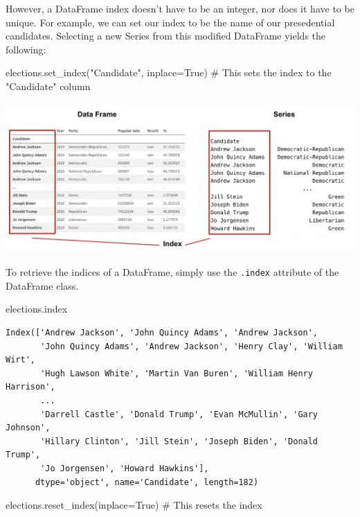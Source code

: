 \documentclass[
  letterpaper,
  DIV=11,
  numbers=noendperiod]{scrreprt}
\newenvironment{Shaded}{\begin{snugshade}}{\end{snugshade}}
\newcommand{\CommentTok}[1]{\textcolor[rgb]{0.37,0.37,0.37}{#1}}
\newcommand{\NormalTok}[1]{\textcolor[rgb]{0.00,0.23,0.31}{#1}}
\newcommand{\OperatorTok}[1]{\textcolor[rgb]{0.37,0.37,0.37}{#1}}
\newcommand{\StringTok}[1]{\textcolor[rgb]{0.13,0.47,0.30}{#1}}
\newcommand{\VariableTok}[1]{\textcolor[rgb]{0.07,0.07,0.07}{#1}}
\begin{document}
However, a DataFrame index doesn't have to be an integer, nor does it
have to be unique. For example, we can set our index to be the name of
our presedential candidates. Selecting a new Series from this modified
DataFrame yields the following:

\begin{Shaded}
\begin{Highlighting}[]
\NormalTok{elections.set\_index(}\StringTok{"Candidate"}\NormalTok{, inplace}\OperatorTok{=}\VariableTok{True}\NormalTok{) }\CommentTok{\# This sets the index to the "Candidate" column}
\end{Highlighting}
\end{Shaded}

\includegraphics{pandas_1/images/index_comparison_2.png}

To retrieve the indices of a DataFrame, simply use the \texttt{.index}
attribute of the DataFrame class.

\begin{Shaded}
\begin{Highlighting}[]
\NormalTok{elections.index}
\end{Highlighting}
\end{Shaded}

\begin{verbatim}
Index(['Andrew Jackson', 'John Quincy Adams', 'Andrew Jackson',
       'John Quincy Adams', 'Andrew Jackson', 'Henry Clay', 'William Wirt',
       'Hugh Lawson White', 'Martin Van Buren', 'William Henry Harrison',
       ...
       'Darrell Castle', 'Donald Trump', 'Evan McMullin', 'Gary Johnson',
       'Hillary Clinton', 'Jill Stein', 'Joseph Biden', 'Donald Trump',
       'Jo Jorgensen', 'Howard Hawkins'],
      dtype='object', name='Candidate', length=182)
\end{verbatim}

\begin{Shaded}
\begin{Highlighting}[]
\NormalTok{elections.reset\_index(inplace}\OperatorTok{=}\VariableTok{True}\NormalTok{) }\CommentTok{\# This resets the index}
\end{Highlighting}
\end{Shaded}
\end{document}
